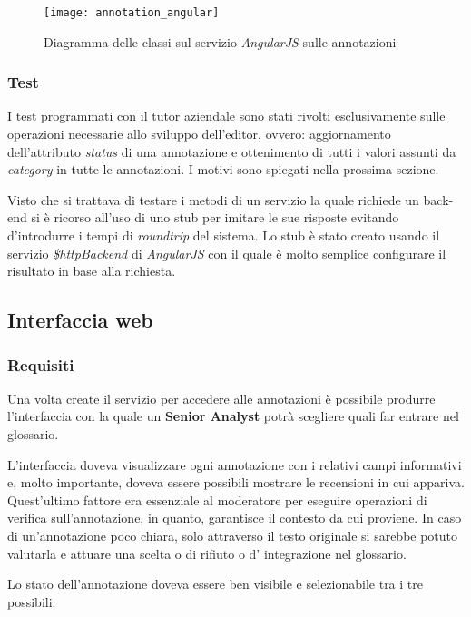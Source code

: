 \begin{figure}[H]
\begin{center}
\texttt{[image: annotation\_angular]}
\caption{
Diagramma delle classi sul servizio \textit{AngularJS} sulle annotazioni
}
\label{fig:annotation_angular}
\end{center}
\end{figure}

\subsubsection{Test}
I test programmati con il tutor aziendale sono stati rivolti esclusivamente
sulle operazioni necessarie allo sviluppo dell'editor, ovvero:
aggiornamento dell'attributo \textit{status} di una annotazione e
ottenimento di tutti i valori assunti da \textit{category} in tutte le
annotazioni. I motivi sono spiegati nella prossima sezione.

Visto che si trattava di testare i metodi di un servizio la quale richiede un
\gls{back-end} si è ricorso all'uso di uno \gls{stub} per imitare le sue
risposte evitando d'introdurre i tempi di \textit{roundtrip} del sistema.
Lo \gls{stub} è stato creato usando il servizio \textit{\$httpBackend} di
\textit{AngularJS} con il quale è molto semplice configurare il risultato in
base alla richiesta.

\subsection{Interfaccia web}
\subsubsection{Requisiti}
Una volta create il servizio per accedere alle annotazioni è possibile produrre
l'interfaccia con la quale un \textbf{Senior Analyst} potrà scegliere quali far
entrare nel glossario.

L'interfaccia doveva visualizzare ogni annotazione con i relativi campi
informativi e, molto importante, doveva essere possibili mostrare le recensioni
in cui appariva. Quest'ultimo fattore era essenziale al moderatore per eseguire
operazioni di verifica sull'annotazione, in quanto, garantisce il contesto da
cui proviene. In caso di un'annotazione poco chiara, solo attraverso il testo
originale si sarebbe potuto valutarla e attuare una scelta o di rifiuto o d'
integrazione nel glossario.

Lo stato dell'annotazione doveva essere ben visibile e selezionabile tra i tre
possibili.


